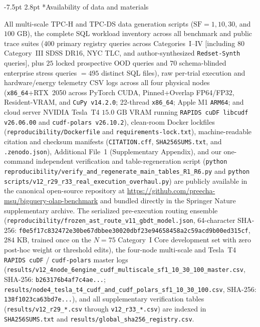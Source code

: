 \documentclass[10pt,a4paper]{article}
\makeatletter
\renewcommand\subsection{\@startsection{subsection}{2}{\z@}%
  {-7.5pt \@plus -2pt \@minus -1pt}%
  {2.8pt \@plus 1pt}%
  {\normalfont\normalsize\bfseries}}
\makeatother
\begin{document}
\subsection*{Availability of data and materials}
{\scriptsize All multi-scale TPC-H and TPC-DS data generation scripts ($\text{SF}=1, 10, 30$, and $100\text{ GB}$), the complete SQL workload inventory across all benchmark and public trace suites ($400$ primary registry queries across Categories~I--IV [including $80$ Category~III SDSS DR16, NYC TLC, and author-synthesized \texttt{Redset-Synth}~\cite{vanrenen2024redset} queries], plus $25$ locked prospective OOD queries and $70$ schema-blinded enterprise stress queries $= 495$ distinct SQL files), raw per-trial execution and hardware/energy telemetry CSV logs across all four physical nodes (\texttt{x86\_64}+RTX~2050 across PyTorch CUDA, Pinned+Overlap FP64/FP32, Resident-VRAM, and \texttt{CuPy v14.2.0}; 22-thread \texttt{x86\_64}; Apple M1 \texttt{ARM64}; and cloud server NVIDIA Tesla~T4 $15.0\text{ GB}$ VRAM running \texttt{RAPIDS cuDF libcudf v26.06.00} and \texttt{cudf-polars v26.10.2}), clean-room Docker lockfiles (\texttt{reproducibility/\allowbreak{}Dockerfile} and \texttt{requirements-\allowbreak{}lock.txt}), machine-readable citation and checksum manifests (\texttt{CITATION.cff}, \texttt{SHA256SUMS.txt}, and \texttt{.zenodo.json}), Additional File~1 (Supplementary Appendix), and our one-command independent verification and table-regeneration script (\texttt{python reproducibility/verify\_\allowbreak{}and\_\allowbreak{}regenerate\_\allowbreak{}main\_\allowbreak{}tables\_\allowbreak{}R1\_\allowbreak{}R6.py} and \texttt{python scripts/v12\_\allowbreak{}r29\_\allowbreak{}r33\_\allowbreak{}real\_\allowbreak{}execution\_\allowbreak{}overhaul.py}) are publicly available in the canonical open-source repository at \url{https://github.com/preecha-msu/bigquery-olap-benchmark} and bundled directly in the Springer Nature supplementary archive. The serialized pre-execution routing ensemble (\texttt{reproducibility/\allowbreak{}frozen\_\allowbreak{}ast\_\allowbreak{}route\_\allowbreak{}v11\_\allowbreak{}gbdt\_\allowbreak{}model.json}, 64-character SHA-256: \texttt{f0e5f17c832472e30be67dbbee30020dbf23e94658458a2c59acd9b00ed315cf}, $284\text{ KB}$, trained once on the $N=75$ Category~I Core development set with zero post-hoc weight or threshold edits), the four-node multi-scale and Tesla~T4 \texttt{RAPIDS cuDF} / \texttt{cudf-polars} master logs (\texttt{results/v12\_\allowbreak{}4node\_\allowbreak{}6engine\_\allowbreak{}cudf\_\allowbreak{}multiscale\_\allowbreak{}sf1\_\allowbreak{}10\_\allowbreak{}30\_\allowbreak{}100\_\allowbreak{}master.csv}, SHA-256: \texttt{b263176b4af7c4ae...}; \texttt{results/node4\_\allowbreak{}tesla\_\allowbreak{}t4\_\allowbreak{}cudf\_\allowbreak{}and\_\allowbreak{}cudf\_\allowbreak{}polars\_\allowbreak{}sf1\_\allowbreak{}10\_\allowbreak{}30\_\allowbreak{}100.csv}, SHA-256: \texttt{138f1023ca63bd7e...}), and all supplementary verification tables (\texttt{results/v12\_\allowbreak{}r29\_*.csv} through \texttt{v12\_\allowbreak{}r33\_*.csv}) are indexed in \texttt{SHA256SUMS.txt} and \texttt{results/\allowbreak{}global\_\allowbreak{}sha256\_\allowbreak{}registry.csv}.\par}
\vspace{-5pt}
\end{document}
